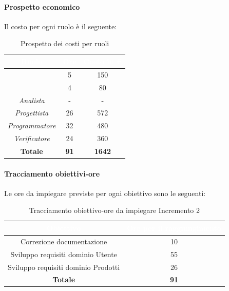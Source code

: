 \paragraph*{Prospetto economico}
Il costo per ogni ruolo è il seguente:
\begin{table}[H]
	\begin{center}
		\begin{tabular}{ |c c c| }
		\rowcolor{darkblue} 
		\textcolor{white}{\textbf{Ruolo}} & \textcolor{white}{\textbf{Ore}} & \textcolor{white}{\textbf{Costo in €}}\\ \hline
		{\Responsabile} 			& 5 	& 150 \\ \hline
		{\Amministratore}		 	& 4 	& 80 \\ \hline
		\textit{Analista} 			& - 	& - \\ \hline
		\textit{Progettista} 		& 26 	& 572 \\ \hline
		\textit{Programmatore}  	& 32 	& 480 \\ \hline
		\textit{Verificatore} 		& 24 	& 360 \\ \hline
		\textbf{Totale} & \textbf{91} & \textbf{1642} \\ \hline
		\end{tabular}
		\caption{Prospetto dei costi per ruoli}
	\end{center}
\end{table}
\paragraph*{Tracciamento obiettivi-ore}
Le ore da impiegare previste per ogni obiettivo sono le seguenti:
\begin{table}[H]
	\begin{center}
		\begin{tabular}{ |c c| }
			\rowcolor{darkblue} 
			\textcolor{white}{\textbf{Obiettivo}}	& \textcolor{white}{\textbf{Ore per il raggiungimento}} \\ \hline
			{Correzione documentazione} 			& 10 	\\ \hline
			{Sviluppo requisiti dominio Utente} 	& 55 	\\ \hline
			{Sviluppo requisiti dominio Prodotti} 	& 26 	\\ \hline
			\textbf{Totale} 						& \textbf{91}  \\ \hline
		\end{tabular}
		\caption{Tracciamento obiettivo-ore da impiegare Incremento 2}
	\end{center}
\end{table}
